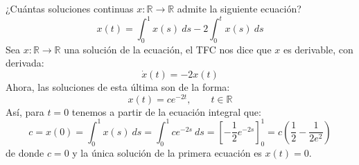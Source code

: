 \documentclass[12pt]{article}
\begin{document}
    \begin{ejercicio}
        ¿Cuántas soluciones continuas $x:\mathbb{R}\to\mathbb{R}$ admite la siguiente ecuación?
        \begin{equation*}
            x(t) = \int_{0}^{1} x(s)~ds  - 2 \int_{0}^{t} x(s)~ds 
        \end{equation*}
        Sea $x:\mathbb{R}\to \mathbb{R}$ una solución de la ecuación, el TFC nos dice que $x$ es derivable, con derivada:
        \begin{equation*}
            \dot{x}(t) = -2x(t)
        \end{equation*}
        Ahora, las soluciones de esta última son de la forma:
        \begin{equation*}
            x(t) = ce^{-2t}, \qquad t\in \mathbb{R}
        \end{equation*}
        Así, para $t=0$ tenemos a partir de la ecuación integral que:
        \begin{equation*}
            c = x(0) = \int_{0}^{1} x(s)~ds = \int_{0}^{1} ce^{-2s}~ds  = \left[-\frac{1}{2}e^{-2s}\right]_0^1 = c\left(\frac{1}{2}-\frac{1}{2e^2}\right)
        \end{equation*}
        de donde $c= 0$ y la única solución de la primera ecuación es $x(t) = 0$.
    \end{ejercicio}
\end{document}
